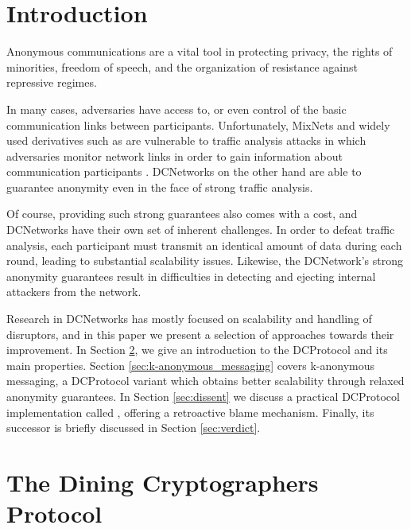 \section{Introduction}

Anonymous communications are a vital tool in protecting privacy, the rights of minorities,
freedom of speech, and the organization of resistance against repressive regimes.

In many cases, adversaries have access to, or even control of the basic communication
links between participants. Unfortunately, \acp{MixNet} \cite{journals/cacm/Chaum81} and 
widely used derivatives such as \Tor \cite{conf/uss/DingledineMS04} are vulnerable to traffic
analysis attacks in which adversaries monitor network links in order to gain information
about communication participants \cite{murdoch2005low}. \acp{DCNetwork} on the other hand
are able to guarantee anonymity even in the face of strong traffic analysis.

Of course, providing such strong guarantees also comes with a cost, and \acp{DCNetwork}
have their own set of inherent challenges. In order to defeat traffic analysis,
each participant must transmit an identical amount of data during each round,
leading to substantial scalability issues. Likewise, the \ac{DCNetwork}'s strong anonymity guarantees result
in difficulties in detecting and ejecting internal attackers from the network.

Research in \acp{DCNetwork} has mostly focused on scalability and handling of disruptors,
and in this paper we present a selection of approaches towards their improvement.
In Section \ref{sec:dining_cryptographers_protocol}, we give an introduction
to the \ac{DCProtocol} and its main properties. Section \ref{sec:k-anonymous_messaging} 
covers k-anonymous messaging, a \ac{DCProtocol} variant which obtains better scalability
through relaxed anonymity guarantees. In Section \ref{sec:dissent} we discuss a practical
\ac{DCProtocol} implementation called \Dissent, offering a retroactive blame mechanism.
Finally, its successor \Verdict is briefly discussed in Section \ref{sec:verdict}.

\section{The Dining Cryptographers Protocol} \label{sec:dining_cryptographers_protocol}


